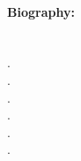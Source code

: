 







\paragraph{Biography:} \dotfill \\
.\dotfill \\
.\dotfill \\
.\dotfill \\
.\dotfill \\
.\dotfill \\
.\dotfill \\



\vskip 25pt






